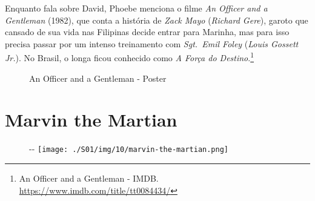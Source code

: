 \saveparinfos
\noindent
\begin{minipage}[c]{0.5\textwidth}\useparinfo

Enquanto fala sobre David, Phoebe menciona o filme \emph{An Officer and
a Gentleman} (1982), que conta a história de \emph{Zack Mayo}
(\emph{Richard Gere}), garoto que cansado de sua vida nas Filipinas
decide entrar para Marinha, mas para isso precisa passar por um intenso
treinamento com \emph{Sgt.~Emil Foley} (\emph{Louis Gossett Jr.}). No
Brasil, o longa ficou conhecido como \emph{A Força do
Destino}.\footnote{\sloppy An Officer and a Gentleman - IMDB. \url{https://www.imdb.com/title/tt0084434/}}

\end{minipage}\hfill
\begin{minipage}[c]{0.45\textwidth}

\begin{figure}
  \centering
    \caption{An Officer and a Gentleman - Poster\label{fig:an-officer-and-a-gentleman-poster}}
\end{figure}

\end{minipage}

\hypertarget{marvin-the-martian}{%
\section{Marvin the Martian}\label{marvin-the-martian}}

\begin{figure}[!ht]
  \begin{adjustwidth}{-\oddsidemargin-1in}{-\rightmargin}
    \centering
    \texttt{[image: ./S01/img/10/marvin-the-martian.png]}
  \end{adjustwidth}
\end{figure}

